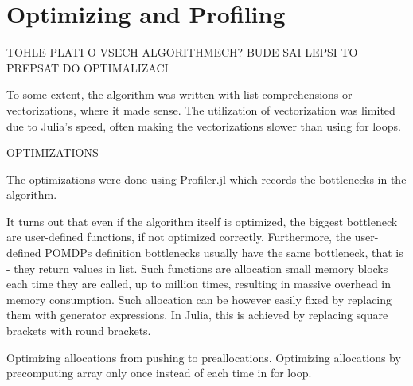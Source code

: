 

\chapter{Optimizing and Profiling}

TOHLE PLATI O VSECH ALGORITHMECH? BUDE SAI LEPSI TO PREPSAT DO OPTIMALIZACI

To some extent, the algorithm was written with list comprehensions or vectorizations, where it made sense. The utilization of vectorization was limited due to Julia's speed, often making the vectorizations slower than using for loops.


OPTIMIZATIONS

The optimizations were done using Profiler.jl which records the bottlenecks in the algorithm.

It turns out that even if the algorithm itself is optimized, the biggest bottleneck are user-defined functions, if not optimized correctly. Furthermore, the user-defined POMDPs definition bottlenecks usually have the same bottleneck, that is - they return values in list. Such functions are allocation small memory blocks each time they are called, up to million times, resulting in massive overhead in memory consumption. Such allocation can be however easily fixed by replacing them with generator expressions. In Julia, this is achieved by replacing square brackets with round brackets.


Optimizing allocations from pushing to preallocations.
Optimizing allocations by precomputing array only once instead of each time in for loop.